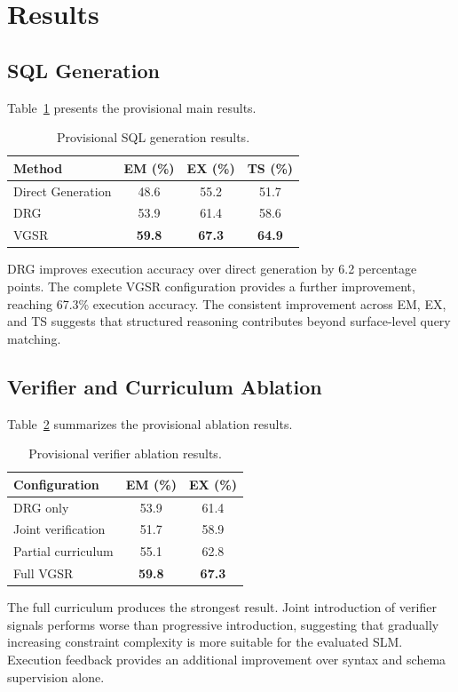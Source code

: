 \documentclass[conference]{IEEEtran}
\begin{document}
\section{Results}
\subsection{SQL Generation}
Table~\ref{tab:sqlresults} presents the provisional main results.

\begin{table}[t]
\centering
\caption{Provisional SQL generation results.}
\label{tab:sqlresults}
\begin{tabular}{lccc}
\toprule
Method & EM (\%) & EX (\%) & TS (\%)\\
\midrule
Direct Generation & 48.6 & 55.2 & 51.7\\
DRG & 53.9 & 61.4 & 58.6\\
VGSR & \textbf{59.8} & \textbf{67.3} & \textbf{64.9}\\
\bottomrule
\end{tabular}
\end{table}

DRG improves execution accuracy over direct generation by 6.2 percentage points. The complete VGSR configuration provides a further improvement, reaching 67.3\% execution accuracy. The consistent improvement across EM, EX, and TS suggests that structured reasoning contributes beyond surface-level query matching.

\subsection{Verifier and Curriculum Ablation}
Table~\ref{tab:ablation} summarizes the provisional ablation results.

\begin{table}[t]
\centering
\caption{Provisional verifier ablation results.}
\label{tab:ablation}
\begin{tabular}{lcc}
\toprule
Configuration & EM (\%) & EX (\%)\\
\midrule
DRG only & 53.9 & 61.4\\
Joint verification & 51.7 & 58.9\\
Partial curriculum & 55.1 & 62.8\\
Full VGSR & \textbf{59.8} & \textbf{67.3}\\
\bottomrule
\end{tabular}
\end{table}

The full curriculum produces the strongest result. Joint introduction of verifier signals performs worse than progressive introduction, suggesting that gradually increasing constraint complexity is more suitable for the evaluated SLM. Execution feedback provides an additional improvement over syntax and schema supervision alone.
\end{document}
